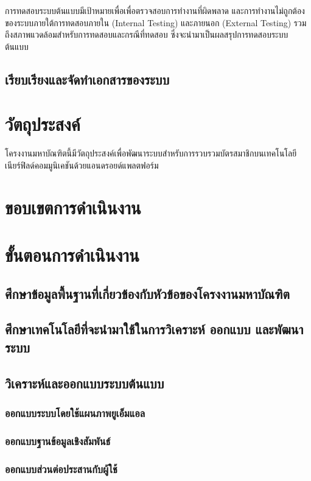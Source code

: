 \documentclass[a4paper]{article}
\begin{document}
การทดสอบระบบต้นแบบมีเป้าหมายเพื่อเพื่อตรวจสอบการทํางานที่ผิดพลาด และการทํางานไม่ถูกต้องของระบบภายใต้การทดสอบภายใน (Internal Testing) และภายนอก (External Testing) รวมถึงสภาพแวดล้อมสําหรับการทดสอบและกรณีที่ทดสอบ ซึ่งจะนํามาเป็นผลสรุปการทดสอบระบบต้นแบบ

\subsection{เรียบเรียงและจัดทําเอกสารของระบบ}

\section{วัตถุประสงค์}

โครงงานมหาบัณฑิตนี้มีวัตถุประสงค์เพื่อพัฒนาระบบสำหรับการรวบรวมบัตรสมาชิกบนเทคโนโลยีเนียร์ฟิลด์คอมมูนิเคชันด้วยแอนดรอยด์แพลตฟอร์ม

\section{ขอบเขตการดำเนินงาน}

\section{ขั้นตอนการดำเนินงาน}

\subsection{ศึกษาข้อมูลพื้นฐานที่เกี่ยวข้องกับหัวข้อของโครงงานมหาบัณฑิต}
\subsection{ศึกษาเทคโนโลยีที่จะนํามาใช้ในการวิเคราะห์ ออกแบบ และพัฒนาระบบ}
\subsection{วิเคราะห์และออกแบบระบบต้นแบบ}
\subsubsection{ออกแบบระบบโดยใช้แผนภาพยูเอ็มแอล}
\subsubsection{ออกแบบฐานข้อมูลเชิงสัมพันธ์}
\subsubsection{ออกแบบส่วนต่อประสานกับผู้ใช้}
\end{document}
